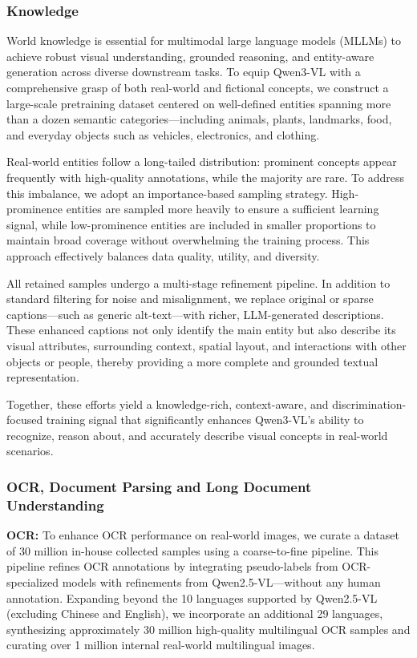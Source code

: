 \documentclass{article} %
\begin{document}
\subsubsection{Knowledge}
World knowledge is essential for multimodal large language models (MLLMs) to achieve robust visual understanding, grounded reasoning, and entity-aware generation across diverse downstream tasks. To equip Qwen3-VL with a comprehensive grasp of both real-world and fictional concepts, we construct a large-scale pretraining dataset centered on well-defined entities spanning more than a dozen semantic categories—including animals, plants, landmarks, food, and everyday objects such as vehicles, electronics, and clothing.

Real-world entities follow a long-tailed distribution: prominent concepts appear frequently with high-quality annotations, while the majority are rare. To address this imbalance, we adopt an importance-based sampling strategy. High-prominence entities are sampled more heavily to ensure a sufficient learning signal, while low-prominence entities are included in smaller proportions to maintain broad coverage without overwhelming the training process. This approach effectively balances data quality, utility, and diversity.

All retained samples undergo a multi-stage refinement pipeline. In addition to standard filtering for noise and misalignment, we replace original or sparse captions—such as generic alt-text—with richer, LLM-generated descriptions. These enhanced captions not only identify the main entity but also describe its visual attributes, surrounding context, spatial layout, and interactions with other objects or people, thereby providing a more complete and grounded textual representation.

Together, these efforts yield a knowledge-rich, context-aware, and discrimination-focused training signal that significantly enhances Qwen3-VL’s ability to recognize, reason about, and accurately describe visual concepts in real-world scenarios.


\subsubsection{OCR, Document Parsing and Long Document Understanding}

\textbf{OCR:} 
To enhance OCR performance on real-world images, we curate a dataset of 30 million in-house collected samples using a coarse-to-fine pipeline. This pipeline refines OCR annotations by integrating pseudo-labels from OCR-specialized models with refinements from Qwen2.5-VL—without any human annotation.
Expanding beyond the 10 languages supported by Qwen2.5-VL (excluding Chinese and English), we incorporate an additional 29 languages, synthesizing approximately 30 million high-quality multilingual OCR samples and curating over 1 million internal real-world multilingual images.
\end{document}
